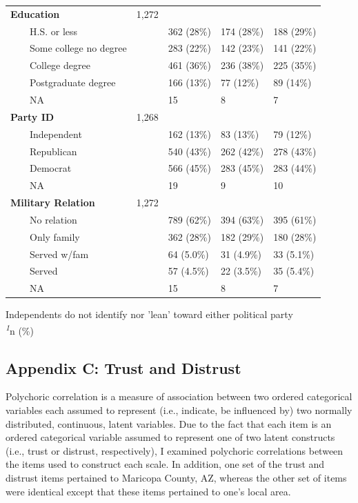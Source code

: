 \documentclass[
  12pt,
  letterpaper,
]{article}
\begin{document}
\begin{table}
{\begin{tabular*}{\linewidth}{@{\extracolsep{\fill}}lllll}
{\bfseries Education} & 1,272 &  &  &  \\ 
    H.S. or less &  & 362 (28\%) & 174 (28\%) & 188 (29\%) \\ 
    Some college no degree &  & 283 (22\%) & 142 (23\%) & 141 (22\%) \\ 
    College degree &  & 461 (36\%) & 236 (38\%) & 225 (35\%) \\ 
    Postgraduate degree &  & 166 (13\%) & 77 (12\%) & 89 (14\%) \\ 
    NA &  & 15 & 8 & 7 \\ 
{\bfseries Party ID} & 1,268 &  &  &  \\ 
    Independent &  & 162 (13\%) & 83 (13\%) & 79 (12\%) \\ 
    Republican &  & 540 (43\%) & 262 (42\%) & 278 (43\%) \\ 
    Democrat &  & 566 (45\%) & 283 (45\%) & 283 (44\%) \\ 
    NA &  & 19 & 9 & 10 \\ 
{\bfseries Military Relation} & 1,272 &  &  &  \\ 
    No relation &  & 789 (62\%) & 394 (63\%) & 395 (61\%) \\ 
    Only family &  & 362 (28\%) & 182 (29\%) & 180 (28\%) \\ 
    Served w/fam &  & 64 (5.0\%) & 31 (4.9\%) & 33 (5.1\%) \\ 
    Served &  & 57 (4.5\%) & 22 (3.5\%) & 35 (5.4\%) \\ 
    NA &  & 15 & 8 & 7 \\ 
\bottomrule
\end{tabular*}
\begin{minipage}{\linewidth}
Independents do not identify nor 'lean' toward either political party\\
\textsuperscript{\textit{1}}n (\%)\\
\end{minipage}

}

\end{table}%

\newpage

\subsection{Appendix C: Trust and Distrust}\label{sec-appendix-c}

Polychoric correlation is a measure of association between two ordered
categorical variables each assumed to represent (i.e., indicate, be
influenced by) two normally distributed, continuous, latent variables.
Due to the fact that each item is an ordered categorical variable
assumed to represent one of two latent constructs (i.e., trust or
distrust, respectively), I examined polychoric correlations between the
items used to construct each scale. In addition, one set of the trust
and distrust items pertained to Maricopa County, AZ, whereas the other
set of items were identical except that these items pertained to one's
local area.
\end{document}
